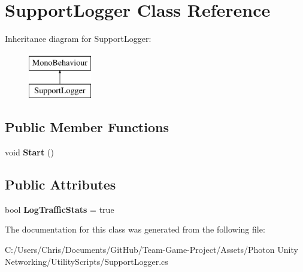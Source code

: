 \hypertarget{class_support_logger}{}\section{Support\+Logger Class Reference}
\label{class_support_logger}
Inheritance diagram for Support\+Logger\+:\begin{figure}[H]
\begin{center}
\leavevmode
\includegraphics[height=2.000000cm]{class_support_logger}
\end{center}
\end{figure}
\subsection*{Public Member Functions}
\begin{DoxyCompactItemize}
\item 
void {\bfseries Start} ()\hypertarget{class_support_logger_a27f7c71460d51d1cdb08735a4c5ca869}{}\label{class_support_logger_a27f7c71460d51d1cdb08735a4c5ca869}

\end{DoxyCompactItemize}
\subsection*{Public Attributes}
\begin{DoxyCompactItemize}
\item 
bool {\bfseries Log\+Traffic\+Stats} = true\hypertarget{class_support_logger_a73de1756bad6a637924df2975c088e47}{}\label{class_support_logger_a73de1756bad6a637924df2975c088e47}

\end{DoxyCompactItemize}


The documentation for this class was generated from the following file\+:\begin{DoxyCompactItemize}
\item 
C\+:/\+Users/\+Chris/\+Documents/\+Git\+Hub/\+Team-\/\+Game-\/\+Project/\+Assets/\+Photon Unity Networking/\+Utility\+Scripts/Support\+Logger.\+cs\end{DoxyCompactItemize}
